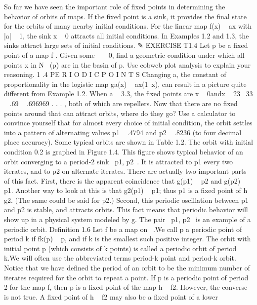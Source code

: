 \documentclass{article}
\begin{document}
So far we have seen the important role of fixed points in determining the
behavior of orbits of maps. If the fixed point is a sink, it provides the final state for
the orbits of many nearby initial conditions. For the linear map f(x)   ax with
|a|   1, the sink x   0 attracts all initial conditions. In Examples 1.2 and 1.3,
the sinks attract large sets of initial conditions.
✎ EXERCISE T1.4
Let p be a fixed point of a map f . Given some     0, find a geometric
condition under which all points x in N  (p) are in the basin of p. Use
cobweb plot analysis to explain your reasoning.
1 .4 PE R I O D I C P O I N T S
Changing a, the constant of proportionality in the logistic map ga(x)   ax(1 x),
can result in a picture quite different from Example 1.2. When a   3.3, the fixed
points are x   0andx   23  33   .69   .696969 . . . , both of which are repellers.
Now that there are no fixed points around that can attract orbits, where do they
go? Use a calculator to convince yourself that for almost every choice of initial
condition, the orbit settles into a pattern of alternating values p1   .4794 and
p2   .8236 (to four decimal place accuracy). Some typical orbits are shown in
Table 1.2. The orbit with initial condition 0.2 is graphed in Figure 1.4. This
figure shows typical behavior of an orbit converging to a period-2 sink  p1, p2 . It
is attracted to p1 every two iterates, and to p2 on alternate iterates.
There are actually two important parts of this fact. First, there is the apparent
coincidence that g(p1)   p2 and g(p2)   p1. Another way to look at this is that
g2(p1)   p1; thus p1 is a fixed point of h   g2. (The same could be said for p2.)
Second, this periodic oscillation between p1 and p2 is stable, and attracts orbits.
This fact means that periodic behavior will show up in a physical system modeled
by g. The pair  p1, p2  is an example of a periodic orbit.
Definition 1.6 Let f be a map on  .We call p a periodic point of period
k if fk(p)   p, and if k is the smallest such positive integer. The orbit with initial
point p (which consists of k points) is called a periodic orbit of period k.We will
often use the abbreviated terms period-k point and period-k orbit.
Notice that we have defined the period of an orbit to be the minimum
number of iterates required for the orbit to repeat a point. If p is a periodic point
of period 2 for the map f, then p is a fixed point of the map h   f2. However, the
converse is not true. A fixed point of h   f2 may also be a fixed point of a lower
\end{document}
